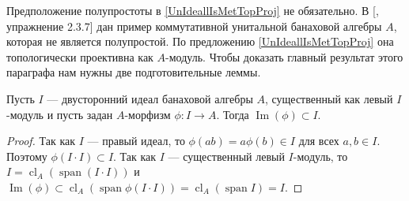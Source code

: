 Предположение полупростоты в \ref{UnIdeallIsMetTopProj} не обязательно. В [\cite{DalesIntroBanAlgOpHarmAnal}, упражнение 2.3.7] дан пример коммутативной унитальной банаховой алгебры $A$, которая не является полупростой. По предложению \ref{UnIdeallIsMetTopProj} она топологически проективна как $A$-модуль. Чтобы доказать главный результат этого параграфа нам нужны две подготовительные леммы.

\begin{lemma}\label{ImgOfAMorphFromBiIdToA} Пусть $I$ --- двусторонний идеал банаховой алгебры $A$, существенный как левый $I$-модуль и пусть задан $A$-морфизм $\phi:I\to A$. Тогда $\operatorname{Im}(\phi)\subset I$.
\end{lemma}
\begin{proof} Так как $I$ --- правый идеал, то $\phi(ab)=a\phi(b)\in I$ для всех $a,b\in I$. Поэтому $\phi(I\cdot I)\subset I$. Так как $I$ --- существенный левый $I$-модуль, то $I=\operatorname{cl}_A(\operatorname{span}(I\cdot I))$ и $\operatorname{Im}(\phi)\subset\operatorname{cl}_A(\operatorname{span}\phi(I\cdot I))=\operatorname{cl}_A(\operatorname{span}I)=I$.
\end{proof}


